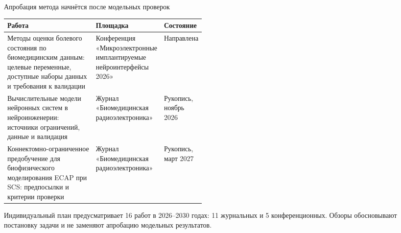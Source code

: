 \begin{frame}{Апробация метода начнётся после модельных проверок}
{\fontsize{12}{14.4}\selectfont
\begin{tabularx}{\linewidth}{|Y|L{0.30\linewidth}|L{0.17\linewidth}|}
\hline Работа & Площадка & Состояние \\\hline
Методы оценки болевого состояния по биомедицинским данным: целевые переменные, доступные наборы данных и требования к валидации & Конференция «Микроэлектронные имплантируемые нейроинтерфейсы 2026» & Направлена \\\hline
Вычислительные модели нейронных систем в нейроинженерии: источники ограничений, данные и валидация & Журнал «Биомедицинская радиоэлектроника» & Рукопись, ноябрь 2026 \\\hline
Коннектомно-ограниченное предобучение для биофизического моделирования ECAP при SCS: предпосылки и критерии проверки & Журнал «Биомедицинская радиоэлектроника» & Рукопись, март 2027 \\\hline
\end{tabularx}\par}
\SlideGap
Индивидуальный план предусматривает 16 работ в 2026--2030 годах: 11 журнальных и 5 конференционных. Обзоры обосновывают постановку задачи и не заменяют апробацию модельных результатов.
\end{frame}
